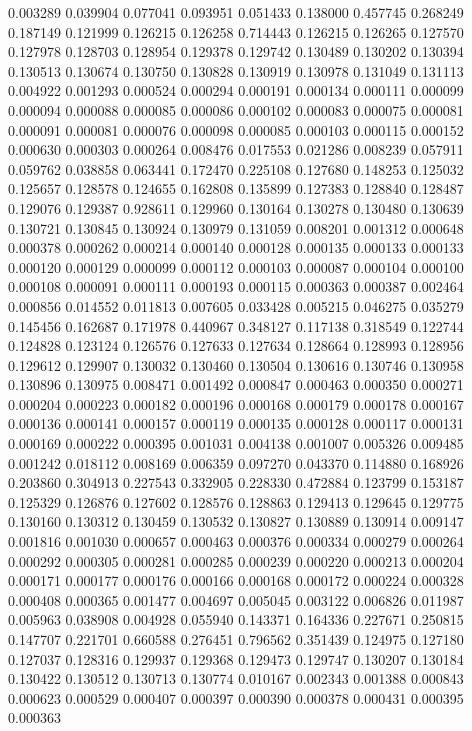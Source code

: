 0.003289
0.039904
0.077041
0.093951
0.051433
0.138000
0.457745
0.268249
0.187149
0.121999
0.126215
0.126258
0.714443
0.126215
0.126265
0.127570
0.127978
0.128703
0.128954
0.129378
0.129742
0.130489
0.130202
0.130394
0.130513
0.130674
0.130750
0.130828
0.130919
0.130978
0.131049
0.131113
0.004922
0.001293
0.000524
0.000294
0.000191
0.000134
0.000111
0.000099
0.000094
0.000088
0.000085
0.000086
0.000102
0.000083
0.000075
0.000081
0.000091
0.000081
0.000076
0.000098
0.000085
0.000103
0.000115
0.000152
0.000630
0.000303
0.000264
0.008476
0.017553
0.021286
0.008239
0.057911
0.059762
0.038858
0.063441
0.172470
0.225108
0.127680
0.148253
0.125032
0.125657
0.128578
0.124655
0.162808
0.135899
0.127383
0.128840
0.128487
0.129076
0.129387
0.928611
0.129960
0.130164
0.130278
0.130480
0.130639
0.130721
0.130845
0.130924
0.130979
0.131059
0.008201
0.001312
0.000648
0.000378
0.000262
0.000214
0.000140
0.000128
0.000135
0.000133
0.000133
0.000120
0.000129
0.000099
0.000112
0.000103
0.000087
0.000104
0.000100
0.000108
0.000091
0.000111
0.000193
0.000115
0.000363
0.000387
0.002464
0.000856
0.014552
0.011813
0.007605
0.033428
0.005215
0.046275
0.035279
0.145456
0.162687
0.171978
0.440967
0.348127
0.117138
0.318549
0.122744
0.124828
0.123124
0.126576
0.127633
0.127634
0.128664
0.128993
0.128956
0.129612
0.129907
0.130032
0.130460
0.130504
0.130616
0.130746
0.130958
0.130896
0.130975
0.008471
0.001492
0.000847
0.000463
0.000350
0.000271
0.000204
0.000223
0.000182
0.000196
0.000168
0.000179
0.000178
0.000167
0.000136
0.000141
0.000157
0.000119
0.000135
0.000128
0.000117
0.000131
0.000169
0.000222
0.000395
0.001031
0.004138
0.001007
0.005326
0.009485
0.001242
0.018112
0.008169
0.006359
0.097270
0.043370
0.114880
0.168926
0.203860
0.304913
0.227543
0.332905
0.228330
0.472884
0.123799
0.153187
0.125329
0.126876
0.127602
0.128576
0.128863
0.129413
0.129645
0.129775
0.130160
0.130312
0.130459
0.130532
0.130827
0.130889
0.130914
0.009147
0.001816
0.001030
0.000657
0.000463
0.000376
0.000334
0.000279
0.000264
0.000292
0.000305
0.000281
0.000285
0.000239
0.000220
0.000213
0.000204
0.000171
0.000177
0.000176
0.000166
0.000168
0.000172
0.000224
0.000328
0.000408
0.000365
0.001477
0.004697
0.005045
0.003122
0.006826
0.011987
0.005963
0.038908
0.004928
0.055940
0.143371
0.164336
0.227671
0.250815
0.147707
0.221701
0.660588
0.276451
0.796562
0.351439
0.124975
0.127180
0.127037
0.128316
0.129937
0.129368
0.129473
0.129747
0.130207
0.130184
0.130422
0.130512
0.130713
0.130774
0.010167
0.002343
0.001388
0.000843
0.000623
0.000529
0.000407
0.000397
0.000390
0.000378
0.000431
0.000395
0.000363
